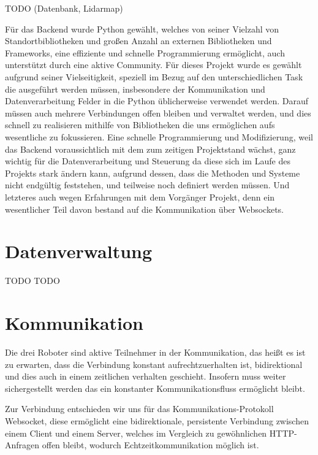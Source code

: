 TODO (Datenbank, Lidarmap)


Für das Backend wurde Python gewählt, 
welches von seiner Vielzahl von Standortbibliotheken und 
großen Anzahl an externen Bibliotheken und Frameworks, 
eine effiziente und schnelle Programmierung ermöglicht, 
auch unterstützt durch eine aktive Community.
% 
Für dieses Projekt wurde es gewählt aufgrund seiner Vielseitigkeit, 
speziell im Bezug auf den unterschiedlichen Task die ausgeführt werden müssen, 
insbesondere der Kommunikation und Datenverarbeitung 
Felder in die Python üblicherweise verwendet werden.
% 
Darauf müssen auch mehrere Verbindungen offen bleiben und verwaltet werden,
und dies schnell zu realisieren mithilfe von Bibliotheken 
die uns ermöglichen aufs wesentliche zu fokussieren.
% 
Eine schnelle Programmierung und Modifizierung, 
weil das Backend voraussichtlich mit dem zum zeitigen Projektstand wächst, 
ganz wichtig für die Datenverarbeitung und Steuerung da diese sich im Laufe des Projekts stark ändern kann,
aufgrund dessen, dass die Methoden und Systeme nicht endgültig feststehen, 
und teilweise noch definiert werden müssen.
% 
Und letzteres auch wegen Erfahrungen mit dem Vorgänger Projekt, 
denn ein wesentlicher Teil davon bestand auf die Kommunikation über Websockets.

\section{Datenverwaltung}
\label{subsec:backend_data}
TODO
TODO

\section{Kommunikation}
\label{subsec:Kommunikation}
Die drei Roboter sind aktive Teilnehmer in der Kommunikation, 
das heißt es ist zu erwarten, dass die Verbindung konstant aufrechtzuerhalten ist,
bidirektional und dies auch in einem zeitlichen verhalten geschieht. 
Insofern muss weiter sichergestellt werden das ein konstanter Kommunikationsfluss ermöglicht bleibt.

Zur Verbindung entschieden wir uns für das Kommunikations-Protokoll Websocket, 
diese ermöglicht eine bidirektionale, persistente Verbindung zwischen einem Client und einem Server,
welches im Vergleich zu gewöhnlichen HTTP-Anfragen offen bleibt, wodurch Echtzeitkommunikation möglich ist.

